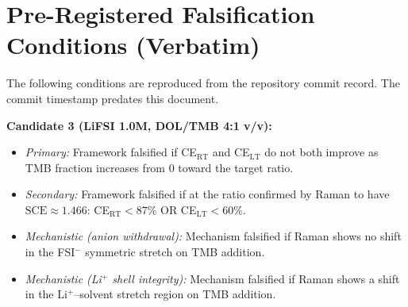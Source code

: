 \documentclass[11pt]{article}
\theoremstyle{plain}
\theoremstyle{definition}
\theoremstyle{remark}
\begin{document}
\section{Pre-Registered Falsification Conditions (Verbatim)}
\label{app:falsification}

The following conditions are reproduced from the repository commit
record.  The commit timestamp predates this document.

\medskip
\noindent\textbf{Candidate 3 (LiFSI 1.0M, DOL/TMB 4:1 v/v):}
\begin{itemize}[leftmargin=2em]
  \item \textit{Primary:} Framework falsified if CE$_\mathrm{RT}$ and
        CE$_\mathrm{LT}$ do not both improve as TMB fraction increases
        from 0 toward the target ratio.
  \item \textit{Secondary:} Framework falsified if at the ratio confirmed
        by Raman to have $\mathrm{SCE} \approx 1.466$:
        CE$_\mathrm{RT} < 87\%$ OR CE$_\mathrm{LT} < 60\%$.
  \item \textit{Mechanistic (anion withdrawal):} Mechanism falsified if
        Raman shows no shift in the FSI$^-$ symmetric stretch on TMB
        addition.
  \item \textit{Mechanistic (Li$^+$ shell integrity):} Mechanism
        falsified if Raman shows a shift in the Li$^+$--solvent stretch
        region on TMB addition.
\end{itemize}
\end{document}
